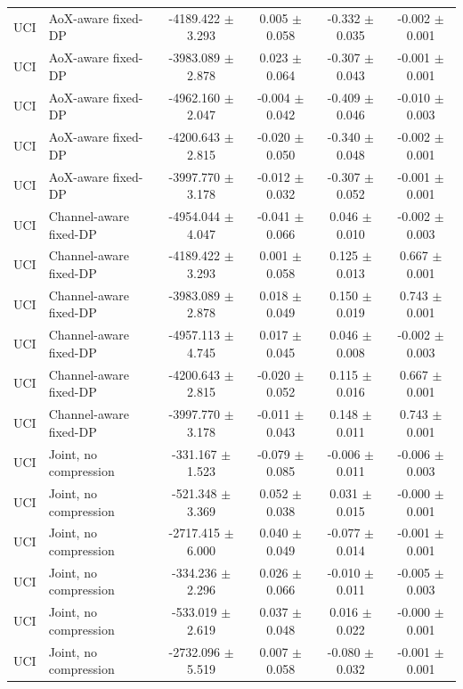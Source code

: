 \begin{table}[t]
\begin{tabular}{llcccc}
UCI & AoX-aware fixed-DP & -4189.422 $\pm$ 3.293 & 0.005 $\pm$ 0.058 & -0.332 $\pm$ 0.035 & -0.002 $\pm$ 0.001 \\
UCI & AoX-aware fixed-DP & -3983.089 $\pm$ 2.878 & 0.023 $\pm$ 0.064 & -0.307 $\pm$ 0.043 & -0.001 $\pm$ 0.001 \\
UCI & AoX-aware fixed-DP & -4962.160 $\pm$ 2.047 & -0.004 $\pm$ 0.042 & -0.409 $\pm$ 0.046 & -0.010 $\pm$ 0.003 \\
UCI & AoX-aware fixed-DP & -4200.643 $\pm$ 2.815 & -0.020 $\pm$ 0.050 & -0.340 $\pm$ 0.048 & -0.002 $\pm$ 0.001 \\
UCI & AoX-aware fixed-DP & -3997.770 $\pm$ 3.178 & -0.012 $\pm$ 0.032 & -0.307 $\pm$ 0.052 & -0.001 $\pm$ 0.001 \\
UCI & Channel-aware fixed-DP & -4954.044 $\pm$ 4.047 & -0.041 $\pm$ 0.066 & 0.046 $\pm$ 0.010 & -0.002 $\pm$ 0.003 \\
UCI & Channel-aware fixed-DP & -4189.422 $\pm$ 3.293 & 0.001 $\pm$ 0.058 & 0.125 $\pm$ 0.013 & 0.667 $\pm$ 0.001 \\
UCI & Channel-aware fixed-DP & -3983.089 $\pm$ 2.878 & 0.018 $\pm$ 0.049 & 0.150 $\pm$ 0.019 & 0.743 $\pm$ 0.001 \\
UCI & Channel-aware fixed-DP & -4957.113 $\pm$ 4.745 & 0.017 $\pm$ 0.045 & 0.046 $\pm$ 0.008 & -0.002 $\pm$ 0.003 \\
UCI & Channel-aware fixed-DP & -4200.643 $\pm$ 2.815 & -0.020 $\pm$ 0.052 & 0.115 $\pm$ 0.016 & 0.667 $\pm$ 0.001 \\
UCI & Channel-aware fixed-DP & -3997.770 $\pm$ 3.178 & -0.011 $\pm$ 0.043 & 0.148 $\pm$ 0.011 & 0.743 $\pm$ 0.001 \\
UCI & Joint, no compression & -331.167 $\pm$ 1.523 & -0.079 $\pm$ 0.085 & -0.006 $\pm$ 0.011 & -0.006 $\pm$ 0.003 \\
UCI & Joint, no compression & -521.348 $\pm$ 3.369 & 0.052 $\pm$ 0.038 & 0.031 $\pm$ 0.015 & -0.000 $\pm$ 0.001 \\
UCI & Joint, no compression & -2717.415 $\pm$ 6.000 & 0.040 $\pm$ 0.049 & -0.077 $\pm$ 0.014 & -0.001 $\pm$ 0.001 \\
UCI & Joint, no compression & -334.236 $\pm$ 2.296 & 0.026 $\pm$ 0.066 & -0.010 $\pm$ 0.011 & -0.005 $\pm$ 0.003 \\
UCI & Joint, no compression & -533.019 $\pm$ 2.619 & 0.037 $\pm$ 0.048 & 0.016 $\pm$ 0.022 & -0.000 $\pm$ 0.001 \\
UCI & Joint, no compression & -2732.096 $\pm$ 5.519 & 0.007 $\pm$ 0.058 & -0.080 $\pm$ 0.032 & -0.001 $\pm$ 0.001 \\

\end{tabular}
\end{table}
